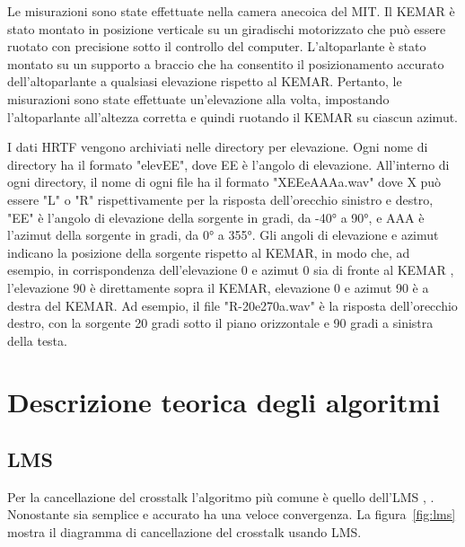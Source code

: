 \documentclass[12pt,a4paper,titlepage]{article}
\begin{document}
Le misurazioni sono state effettuate nella camera anecoica del MIT. Il KEMAR è stato montato in posizione verticale su un giradischi motorizzato che può essere ruotato con precisione sotto il controllo del computer. L'altoparlante è stato montato su un supporto a braccio che ha consentito il posizionamento accurato dell'altoparlante a qualsiasi elevazione rispetto al KEMAR. Pertanto, le misurazioni sono state effettuate un'elevazione alla volta, impostando l'altoparlante all'altezza corretta e quindi ruotando il KEMAR su ciascun azimut.

I dati HRTF vengono archiviati nelle directory per elevazione. Ogni nome di directory ha il formato "elevEE", dove EE è l'angolo di elevazione. All'interno di ogni directory, il nome di ogni file ha il formato "XEEeAAAa.wav" dove X può essere "L" o "R" rispettivamente per la risposta dell'orecchio sinistro e destro, "EE" è l'angolo di elevazione della sorgente in gradi, da -40° a 90°, e AAA è l'azimut della sorgente in gradi, da 0° a 355°. Gli angoli di elevazione e azimut indicano la posizione della sorgente rispetto al KEMAR, in modo che, ad esempio, in corrispondenza dell'elevazione 0 e azimut 0 sia di fronte al KEMAR , l'elevazione 90 è direttamente sopra il KEMAR, elevazione 0 e azimut 90 è a destra del KEMAR. Ad esempio, il file "R-20e270a.wav" è la risposta dell'orecchio destro, con la sorgente 20 gradi sotto il piano orizzontale e 90 gradi a sinistra della testa.
\clearpage
\section{Descrizione teorica degli algoritmi}
\label{sec:descrizione_teorica}
\subsection{LMS}
\label{subsec:LMS_teoria}
Per la cancellazione del crosstalk l'algoritmo più comune è quello dell'LMS \cite{143434}, \cite{4217047}.
Nonostante sia semplice e accurato ha una veloce convergenza. La figura~\ref{fig:lms} mostra il diagramma di cancellazione del crosstalk usando LMS. 
\end{document}
